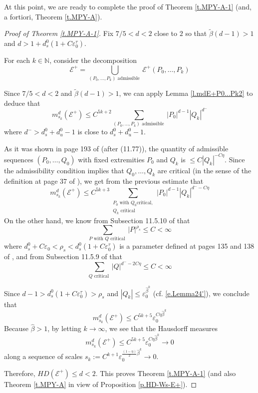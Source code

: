 \documentclass[12pt]{amsart}
\numberwithin{equation}{section}
\theoremstyle{definition}
\newcommand{\<}{{\langle}}
\renewcommand{\>}{{\rangle}}
\begin{document}
At this point, we are ready to complete the proof of Theorem \ref{t.MPY-A-1} (and, a fortiori, Theorem \ref{t.MPY-A}).

\begin{proof}[Proof of Theorem \ref{t.MPY-A-1}] Fix $7/5<d<2$ close to $2$ so that $\widetilde{\beta}(d-1)>1$ and $d>1+d_s^0(1+C\varepsilon_0^{\tau})$. 

For each $k\in\mathbb{N}$, consider the decomposition
$$\mathcal{E}^+=\bigcup\limits_{(P_0,\dots,P_k) \textrm{ admissible }}\mathcal{E}^+(P_0,\dots,P_k)$$

Since $7/5<d<2$ and $\widetilde{\beta}(d-1)>1$, we can apply Lemma \ref{l.mdE+P0...Pk2} to deduce that 
$$m^d_{s_k}(\mathcal{E}^+)\leq C^{5k+2}\sum\limits_{(P_0,\dots,P_k) \textrm{ admissible }}|P_0|^{d-1}|Q_k|^{d^-}$$
where $d^->d_s^0+d_u^0-1$ is close to $d_s^0+d_u^0-1$.

As it was shown in page 193 of \cite{PY09} (after (11.77)), the quantity of admissible sequences $(P_0,\dots, Q_0)$ with fixed extremities $P_0$ and $Q_k$ is $\leq C|Q_k|^{-C\eta}$. Since the admissibility condition implies that $Q_0, \dots, Q_k$ are critical (in the sense of the definition at page 37 of \cite{PY09}), we get from the previous estimate that 
$$m^d_{s_k}(\mathcal{E}^+)\leq C^{5k+3}\sum\limits_{\substack{P_0 \textrm{ with } Q_0 \textrm{critical}, \\ Q_k \textrm{ critical}}}|P_0|^{d-1}|Q_k|^{d^- - C\eta}$$
On the other hand, we know from Subsection 11.5.10 of \cite{PY09} that 
$$\sum\limits_{P \textrm{ with } Q \textrm{ critical }}|P|^{\rho_s}\leq C<\infty$$
where $d_s^0+C\varepsilon_0<\rho_s<d_s^0(1+C\varepsilon_0^{\tau})$ is a parameter defined at pages 135 and 138 of \cite{PY09}, and from Subsection 11.5.9 of \cite{PY09} that 
$$\sum_{Q \textrm{ critical }}|Q|^{d^- - 2C\eta}\leq C<\infty$$

Since $d-1>d_s^0(1+C\varepsilon_0^{\tau})>\rho_s$ and $|Q_k|\leq\varepsilon_0^{\widehat{\beta}^k}$ (cf. \eqref{e.Lemma24'}), we conclude that 
$$m^d_{s_k}(\mathcal{E}^+)\leq C^{5k+5}\varepsilon_0^{C\eta\widehat{\beta}^k}$$
Because $\widehat{\beta}>1$, by letting $k\to\infty$, we see that the Hausdorff measures 
$$m^d_{s_k}(\mathcal{E}^+)\leq C^{5k+5}\varepsilon_0^{C\eta\widehat{\beta}^k}\to 0$$ 
along a sequence of scales $s_k:=C^{k+1}\varepsilon_0^{\frac{(1-\eta)}{2}\widehat{\beta}^k}\to 0$. 

Therefore, $HD(\mathcal{E}^+)\leq d<2$. This proves Theorem \ref{t.MPY-A-1} (and also Theorem \ref{t.MPY-A} in view of Proposition \ref{p.HD-Ws-E+}).
\end{proof}
\end{document}
